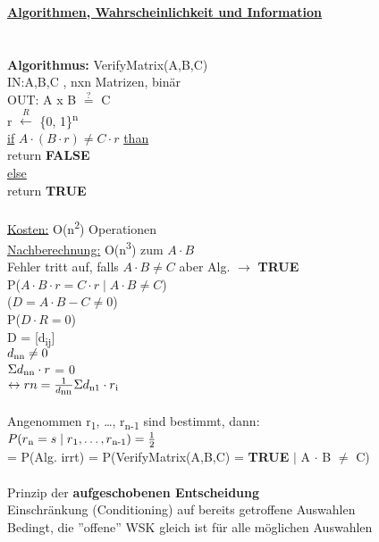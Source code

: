 \documentclass{article}
\begin{document}
 	\textbf{\underline{Algorithmen, Wahrscheinlichkeit und Information}}
 	\\ \\ \\
 	\textbf{Algorithmus:} VerifyMatrix(A,B,C) \\
 	IN:A,B,C , nxn Matrizen, bin\"ar \\
 	OUT: A x B $\stackrel{\mathrm{?}}=$ C \\
 	r $\stackrel{R}\leftarrow$ \{0, 1\}\textsuperscript{n} \\
 	\underline{if} $A \cdot (B \cdot r) \neq C \cdot r$ \underline{than} \\
 	return \textbf{FALSE} \\
 	\underline{else} \\
 	return \textbf{TRUE} \\
 	\\
 	\underline{Kosten:} O(n\textsuperscript{2}) Operationen \\
 	\underline{Nachberechnung:}	O(n\textsuperscript3) zum $A \cdot B$ \\
 	Fehler tritt auf, falls $A \cdot B \neq C$ aber Alg. $\rightarrow$ \textbf{TRUE} \\
 	P($A \cdot B \cdot r = C \cdot r \mid	A \cdot B \neq C$) \\
 	($D = A \cdot B - C \neq 0$) \\
 	P($D \cdot R = 0$) \\
 	D = [d\textsubscript{ij}] \\
 	$d\textsubscript{nn} \neq 0$ \\
 	$\Sigma d\textsubscript{nn} \cdot r$ = 0 \\
 	$\leftrightarrow rn = \frac{1}{d\textsubscript{nn}}  \Sigma d\textsubscript{n1} \cdot r\textsubscript{i}$ \\
 	\\
 	Angenommen r\textsubscript{1}, \ldots, r\textsubscript{n-1} sind bestimmt, dann: \\
 	$P(r\textsubscript{n} = s \mid r\textsubscript{1}, \ldots, r\textsubscript{n-1}) = \frac{1}{2}$ \\
 	= P(Alg. irrt) = P(VerifyMatrix(A,B,C) = \textbf{TRUE} $\mid$ A $\cdot$ B $\neq$ C) \\
 	\\
 	Prinzip der \textbf{aufgeschobenen Entscheidung} \\
 	Einschr\"ankung (Conditioning) auf bereits getroffene Auswahlen \\
 	Bedingt, die ''offene'' WSK gleich ist für alle m\"oglichen Auswahlen  \\
\end{document}
